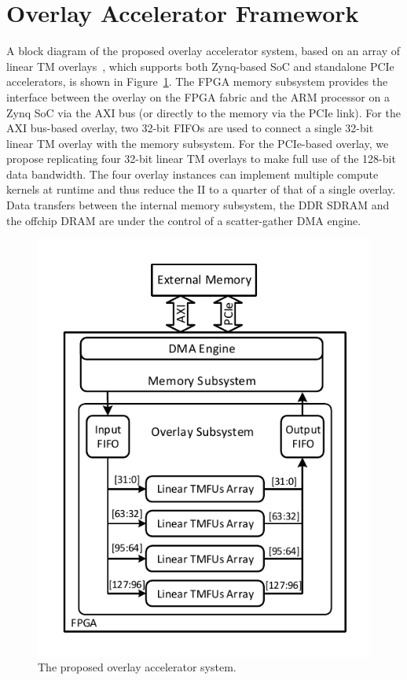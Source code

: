 \section{Overlay Accelerator Framework}
A block diagram of the proposed overlay accelerator system, based on an array of linear TM overlays~\cite{li2018time}, which supports both Zynq-based SoC and standalone PCIe accelerators, is shown in Figure~\ref{system}. 
The FPGA memory subsystem provides the interface between the overlay on the FPGA fabric and the ARM processor on a Zynq SoC via the AXI bus (or directly to the memory via the PCIe link). 
For the AXI bus-based overlay, two 32-bit FIFOs are used to connect a single 32-bit linear TM overlay with the memory subsystem. 
For the PCIe-based overlay, we propose replicating four 32-bit linear TM overlays to make full use of the 128-bit data bandwidth. The four overlay instances can implement multiple compute kernels at runtime and thus reduce the II to a quarter of that of a single overlay. 
Data transfers between the internal memory subsystem, the DDR SDRAM and the offchip DRAM are under the control of a scatter-gather DMA engine. 

\begin{figure}[tb]
	\centering
	\includegraphics[width=\columnwidth]{Figures/system_new.pdf}
	\caption{The proposed overlay accelerator system.}
	\label{system}
\end{figure}

